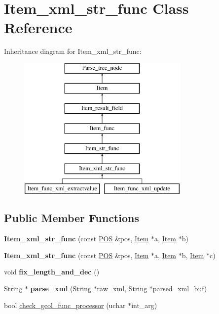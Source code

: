 \hypertarget{classItem__xml__str__func}{}\section{Item\+\_\+xml\+\_\+str\+\_\+func Class Reference}
\label{classItem__xml__str__func}
Inheritance diagram for Item\+\_\+xml\+\_\+str\+\_\+func\+:\begin{figure}[H]
\begin{center}
\leavevmode
\includegraphics[height=7.000000cm]{classItem__xml__str__func}
\end{center}
\end{figure}
\subsection*{Public Member Functions}
\begin{DoxyCompactItemize}
\item 
\mbox{\label{classItem__xml__str__func_ab4e919a3ba8144279429c42d66b87215}} 
{\bfseries Item\+\_\+xml\+\_\+str\+\_\+func} (const \mbox{\hyperlink{structYYLTYPE}{P\+OS}} \&pos, \mbox{\hyperlink{classItem}{Item}} $\ast$a, \mbox{\hyperlink{classItem}{Item}} $\ast$b)
\item 
\mbox{\label{classItem__xml__str__func_aa0b77a8cb90b2718fa97db39c4388bfe}} 
{\bfseries Item\+\_\+xml\+\_\+str\+\_\+func} (const \mbox{\hyperlink{structYYLTYPE}{P\+OS}} \&pos, \mbox{\hyperlink{classItem}{Item}} $\ast$a, \mbox{\hyperlink{classItem}{Item}} $\ast$b, \mbox{\hyperlink{classItem}{Item}} $\ast$c)
\item 
\mbox{\label{classItem__xml__str__func_a6ecf05c495ed487735a08fc1aa9b643b}} 
void {\bfseries fix\+\_\+length\+\_\+and\+\_\+dec} ()
\item 
\mbox{\label{classItem__xml__str__func_a549305c1189331238ae1313d57478c69}} 
String $\ast$ {\bfseries parse\+\_\+xml} (String $\ast$raw\+\_\+xml, String $\ast$parsed\+\_\+xml\+\_\+buf)
\item 
bool \mbox{\hyperlink{classItem__xml__str__func_aad586261f128e8819704b29bdf0c0470}{check\+\_\+gcol\+\_\+func\+\_\+processor}} (uchar $\ast$int\+\_\+arg)
\end{DoxyCompactItemize}
